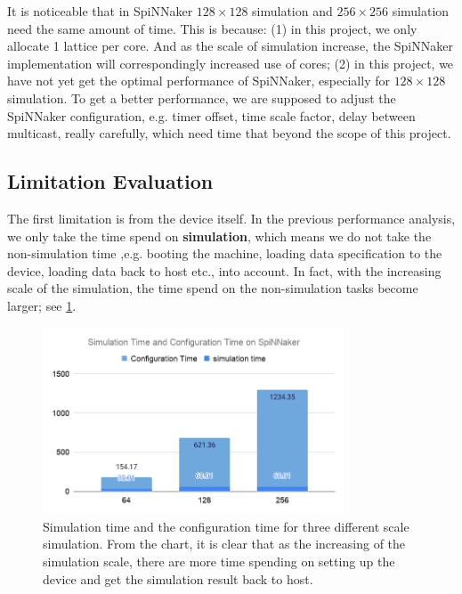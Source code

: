 It is noticeable that in SpiNNaker $128\times128$ simulation and $256\times256$ simulation need the same amount of time. This is because: (1) in this project, we only allocate 1 lattice per core. And as the scale of simulation increase, the SpiNNaker implementation will correspondingly increased use of cores; (2) in this project, we have not yet get the optimal performance of SpiNNaker, especially for $128\times128$ simulation. To get a better performance, we are supposed to adjust the SpiNNaker configuration, e.g. timer offset, time scale factor, delay between multicast, really carefully, which need time that beyond the scope of this project.


\subsection{Limitation Evaluation} \label{sec:ana}
The first limitation is from the device itself. In the previous performance analysis, we only take the time spend on \textbf{simulation}, which means we do not take the non-simulation time ,e.g. booting the machine, loading data specification to the device, loading data back to host etc., into account. In fact, with the increasing scale of the simulation, the time spend on the non-simulation tasks become larger; see \ref{fig:loading}.\\

\begin{figure}[tb]
   \centering
       \includegraphics[width=0.8\textwidth]{figures/Simulation Time and Configuration Time on SpiNNaker.png}
       \caption{Simulation time and the configuration time for three different scale simulation. From the chart, it is clear that as the increasing of the simulation scale, there are more time spending on setting up the device and get the simulation result back to host.}
       \label{fig:loading}
\end{figure}

